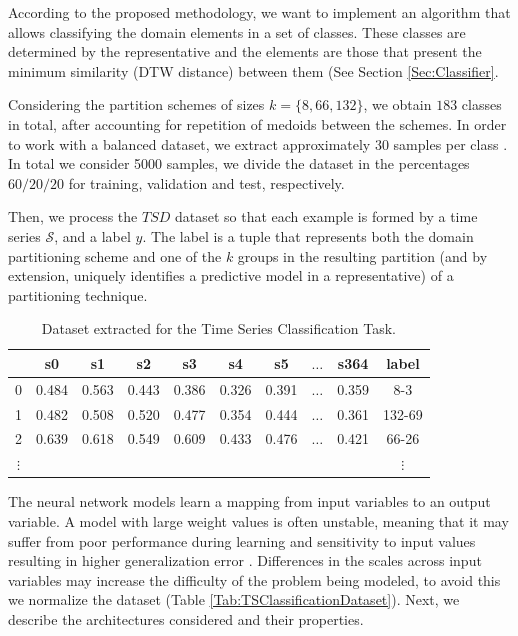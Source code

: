 According to the proposed methodology, we want to implement an algorithm that allows classifying the domain elements in a set of classes. These classes are determined by the representative and the elements are those that present the minimum similarity (DTW distance) between them (See Section \ref{Sec:Classifier}.

Considering the partition schemes of sizes $k=\{8, 66, 132\}$, we obtain $183$ classes in total, after accounting for repetition of medoids between the schemes. In order to work with a balanced dataset, we extract approximately $30$ samples per class \cite{Du2018}. In total we consider 5000 samples, we divide the dataset in the percentages $60/20/20$ for training, validation and test, respectively.

Then, we process the $TSD$ dataset so that each example is formed by a time series $\mathcal{S}$, and a label $y$. The label is a tuple that represents both the domain partitioning scheme and one of the $k$ groups in the resulting partition (and by extension, uniquely identifies a predictive model in a representative) of a partitioning technique.

\begin{table}[h]
	\centering
	\small
	\begin{tabular}[h]{|c|c|c|c|c|c|c|c|c|c|}
		\hline
		  & s0    & s1    & s2    & s3    & s4    &	s5    & $\ldots$ & s364  &   label \\ \hline
		0 & 0.484 & 0.563 & 0.443 & 0.386 & 0.326 &	0.391 & $\ldots$ & 0.359 &   8-3 \\
		1 &	0.482 &	0.508 &	0.520 &	0.477 &	0.354 &	0.444 & $\ldots$ & 0.361 & 132-69 \\
		2 &	0.639 & 0.618 &	0.549 &	0.609 &	0.433 & 0.476 & $\ldots$ & 0.421 &	66-26 \\ 
		$\vdots$  & &     &       &       &       &       &          &       & $\vdots$ \\ \hline
	\end{tabular}
	\caption{Dataset extracted for the Time Series Classification Task.}
	\label{Table:DatasetTSC}
\end{table}

The neural network models learn a mapping from input variables to an output variable. A model with large weight values is often unstable, meaning that it may suffer from poor performance during learning and sensitivity to input values resulting in higher generalization error \cite{Lecun1998}. Differences in the scales across input variables may increase the difficulty of the problem being modeled, to avoid this we normalize the dataset (Table \ref{Tab:TSClassificationDataset}). Next, we describe the architectures considered and their properties.

